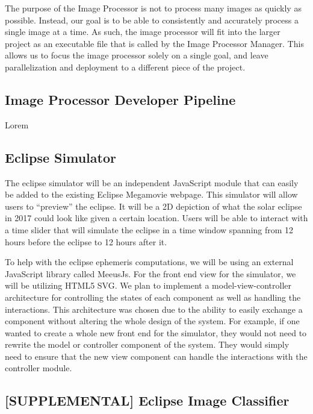 \documentclass[10pt, onecolumn, draftclsnofoot, letterpaper, compsoc]{IEEEtran}
\begin{document}
The purpose of the Image Processor is not to process many images as quickly as
possible. Instead, our goal is to be able to consistently and accurately process
a single image at a time. As such, the image processor will fit into the larger
project as an executable file that is called by the Image Processor Manager.
This allows us to focus the image processor solely on a single goal, and leave
parallelization and deployment to a different piece of the project. \\

\subsection{Image Processor Developer Pipeline}

Lorem \\

\subsection{Eclipse Simulator}

The eclipse simulator will be an independent JavaScript module that can easily
be added to the existing Eclipse Megamovie webpage. This simulator will allow
users to “preview” the eclipse. It will be a 2D depiction of what the solar
eclipse in 2017 could look like given a certain location. Users will be able
to interact with a time slider that will simulate the eclipse in a time
window spanning from 12 hours before the eclipse to 12 hours after it.

To help with the eclipse ephemeris computations, we will be using an external
JavaScript library called MeeusJs. For the front end view for the simulator,
we will be utilizing HTML5 SVG. We plan to implement a model-view-controller
architecture for controlling the states of each component as well as handling
the interactions. This architecture was chosen due to the ability to easily
exchange a component without altering the whole design of the system. For
example, if one wanted to create a whole new front end for the simulator,
they would not need to rewrite the model or controller component of the system.
They would simply need to ensure that the new view component can handle the
interactions with the controller module. \\

\subsection{[SUPPLEMENTAL] Eclipse Image Classifier}
\end{document}
